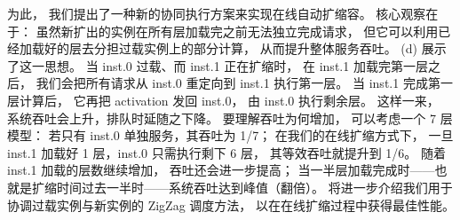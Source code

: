 为此，
我们提出了一种新的协同执行方案来实现在线自动扩缩容。
核心观察在于：
虽然新扩出的实例在所有层加载完之前无法独立完成请求，
但它可以利用已经加载好的层去分担过载实例上的部分计算，
从而提升整体服务吞吐。
{} (d) 展示了这一思想。
当 inst.0 过载、而 inst.1 正在扩缩时，
在 inst.1 加载完第一层之后，
我们会把所有请求从 inst.0 重定向到 inst.1 执行第一层。
当 inst.1 完成第一层计算后，
它再把 activation 发回 inst.0，
由 inst.0 执行剩余层。
这样一来，
系统吞吐会上升，排队时延随之下降。
要理解吞吐为何增加，
可以考虑一个 7 层模型：
若只有 inst.0 单独服务，其吞吐为 1/7；
在我们的在线扩缩方式下，
一旦 inst.1 加载好 1 层，inst.0 只需执行剩下 6 层，
其等效吞吐就提升到 1/6。
随着 inst.1 加载的层数继续增加，
吞吐还会进一步提高；
当一半层加载完成时——也就是扩缩时间过去一半时——系统吞吐达到峰值（翻倍）。
\textsection{\ref{sec:design-pp}} 将进一步介绍我们用于协调过载实例与新实例的 ZigZag 调度方法，
以在在线扩缩过程中获得最佳性能。

